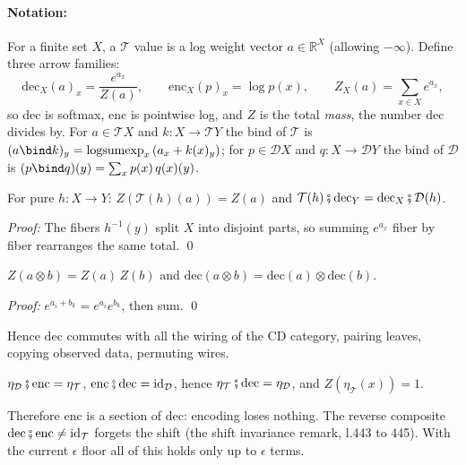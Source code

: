 \documentclass[anon]{../../journal-templates/NeSy26/nesy2026} %
\begin{document}
\begin{description}
\paragraph{Notation:} For a finite set $X$, a $\mathcal T$ value is a log weight vector
$a \in \mathbb R^X$ (allowing $-\infty$). Define three arrow
families:
\[
  \mathrm{dec}_X(a)_x = \frac{e^{a_x}}{Z(a)}, \qquad
  \mathrm{enc}_X(p)_x = \log p(x), \qquad
  Z_X(a) = \sum_{x \in X} e^{a_x},
\]
so $\mathrm{dec}$ is softmax, $\mathrm{enc}$ is pointwise log, and $Z$ is
the total \emph{mass}, the number $\mathrm{dec}$ divides by. For
$a \in \mathcal T X$ and $k \colon X \to \mathcal T Y$ the bind of
$\mathcal T$ is $(a \bind k)_y = \mathrm{logsumexp}_x\,(a_x + k(x)_y)$; for
$p \in \mathcal D X$ and $q \colon X \to \mathcal D Y$ the bind of
$\mathcal D$ is $(p \bind q)(y) = \sum_x p(x)\, q(x)(y)$.

\begin{lemma}
For pure $h \colon X \to Y$:
$Z(\mathcal T(h)(a)) = Z(a)$ and
$\mathcal T(h) \fatsemi \mathrm{dec}_Y = \mathrm{dec}_X \fatsemi \mathcal D(h)$.

\emph{Proof:} The fibers $h^{-1}(y)$ split $X$ into disjoint parts, so
summing $e^{a_x}$ fiber by fiber rearranges the same total. \qed
\end{lemma}

\begin{lemma}[tensor]
$Z(a \otimes b) = Z(a)\,Z(b)$ and
$\mathrm{dec}(a \otimes b) = \mathrm{dec}(a) \otimes \mathrm{dec}(b)$.

\emph{Proof:} $e^{a_i + b_k} = e^{a_i} e^{b_k}$, then sum. \qed
\end{lemma}

Hence $\mathrm{dec}$ commutes with all the wiring of the CD
category, pairing leaves, copying observed data, permuting wires.

\begin{lemma}[units]
$\eta_{\mathcal D} \fatsemi \mathrm{enc} = \eta_{\mathcal T}$,
$\mathrm{enc} \fatsemi \mathrm{dec} = \mathrm{id}_{\mathcal D}$, hence
$\eta_{\mathcal T} \fatsemi \mathrm{dec} = \eta_{\mathcal D}$, and
$Z(\eta_{\mathcal T}(x)) = 1$.
\end{lemma}

Therefore $\mathrm{enc}$ is a section of
$\mathrm{dec}$: encoding loses nothing. The reverse composite
$\mathrm{dec} \fatsemi \mathrm{enc} \ne \mathrm{id}_{\mathcal T}$ forgets
the shift (the shift invariance remark, l.443 to 445). With the current
$\epsilon$ floor all of this holds only up to $\epsilon$ terms.


\end{description}
\end{document}
